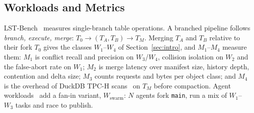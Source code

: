 \documentclass[sigconf, nonacm]{acmart}
\begin{document}
\subsection{Workloads and Metrics}
\label{sec:bg_taxonomy}

LST-Bench~\cite{camacho2024lstbench} measures single-branch table operations. A branched pipeline follows \emph{branch, execute, merge}: $T_0 \to (T_A, T_B) \to T_M$. Merging $T_A$ and $T_B$ relative to their fork $T_0$ gives the classes $W_1$--$W_4$ of Section~\ref{sec:intro}, and $M_1$--$M_4$ measure them: $M_1$ is conflict recall and precision on $W_3$/$W_4$, collision isolation on $W_2$ and the false-abort rate on $W_1$; $M_2$ is merge latency over manifest size, history depth, contention and delta size; $M_3$ counts requests and bytes per object class; and $M_4$ is the overhead of DuckDB TPC-H scans~\cite{tpch} on $T_M$ before compaction. Agent workloads~\cite{git4data2026, ang2026branchbench, zhou2026chronos, lyu2026atr} add a fan-in variant, $W_{\text{swarm}}$: $N$ agents fork \texttt{main}, run a mix of $W_1$--$W_3$ tasks and race to publish.
\end{document}
